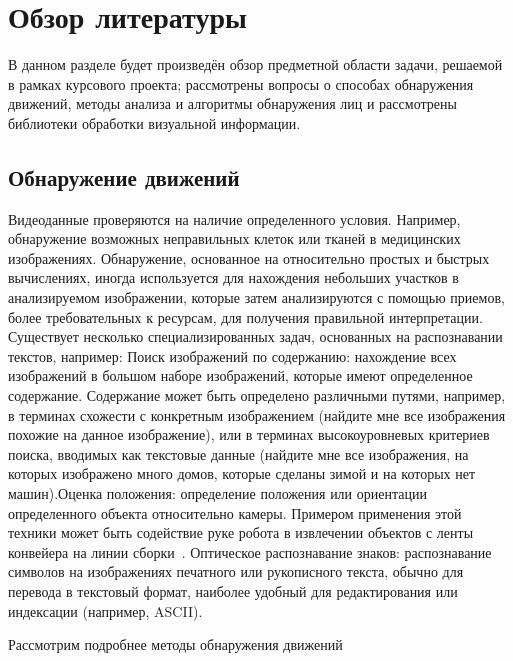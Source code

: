 \section{Обзор литературы}
\label{sec:domain}

В данном разделе будет произведён обзор предметной области задачи, решаемой в рамках курсового проекта; рассмотрены вопросы о способах обнаружения движений, методы анализа и алгоритмы обнаружения лиц и рассмотрены библиотеки обработки визуальной информации.

\subsection{Обнаружение движений}
\label{sub:domain:motion_detect}

Видеоданные проверяются на наличие определенного условия. Например, обнаружение возможных неправильных клеток или тканей в медицинских изображениях. Обнаружение, основанное на относительно простых и быстрых вычислениях, иногда используется для нахождения небольших участков в анализируемом изображении, которые затем анализируются с помощью приемов, более требовательных к ресурсам, для получения правильной интерпретации. Существует несколько специализированных задач, основанных на распознавании текстов, например: Поиск изображений по содержанию: нахождение всех изображений в большом наборе изображений, которые имеют определенное содержание. Содержание может быть определено различными путями, например, в терминах схожести с конкретным изображением (найдите мне все изображения похожие на данное изображение), или в терминах высокоуровневых критериев поиска, вводимых как текстовые данные (найдите мне все изображения, на которых изображено много домов, которые сделаны зимой и на которых нет машин).Оценка положения: определение положения или ориентации определенного объекта относительно камеры. Примером применения этой техники может быть содействие руке робота в извлечении объектов с ленты конвейера на линии сборки~\cite{gorelik_2004}.
Оптическое распознавание знаков: распознавание символов на изображениях печатного или рукописного текста, обычно для перевода в текстовый формат, наиболее удобный для редактирования или индексации (например, ASCII).

Рассмотрим подробнее методы обнаружения движений

